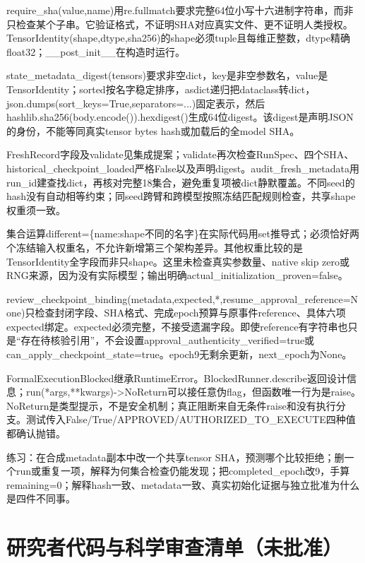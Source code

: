 \documentclass[UTF8,fontset=fandol,10pt]{ctexart}
\begin{document}
require\_\allowbreak{}sha(value,name)用re.fullmatch要求完整64位小写十六进制字符串，而非只检查某个子串。它验证格式，不证明SHA对应真实文件、更不证明人类授权。TensorIdentity(shape,dtype,sha256)的shape必须tuple且每维正整数，dtype精确float32；\_\allowbreak{}\_\allowbreak{}post\_\allowbreak{}init\_\allowbreak{}\_\allowbreak{}在构造时运行。

state\_\allowbreak{}metadata\_\allowbreak{}digest(tensors)要求非空dict，key是非空参数名，value是TensorIdentity；sorted按名字稳定排序，asdict递归把dataclass转dict，json.dumps(sort\_\allowbreak{}keys=True,separators=...)固定表示，然后hashlib.sha256(body.encode()).hexdigest()生成64位digest。该digest是声明JSON的身份，不能等同真实tensor bytes hash或加载后的全model SHA。

FreshRecord字段及validate见集成提案；validate再次检查RunSpec、四个SHA、historical\_\allowbreak{}checkpoint\_\allowbreak{}loaded严格False以及声明digest。audit\_\allowbreak{}fresh\_\allowbreak{}metadata用run\_\allowbreak{}id建查找dict，再核对完整18集合，避免重复项被dict静默覆盖。不同seed的hash没有自动相等约束；同seed跨臂和跨模型按照冻结匹配规则检查，共享shape权重须一致。

集合运算different=\{name:shape不同的名字\}在实际代码用set推导式；必须恰好两个冻结输入权重名，不允许新增第三个架构差异。其他权重比较的是TensorIdentity全字段而非只shape。这里未检查真实参数量、native skip zero或RNG来源，因为没有实际模型；输出明确actual\_\allowbreak{}initialization\_\allowbreak{}proven=false。

review\_\allowbreak{}checkpoint\_\allowbreak{}binding(metadata,expected,*,resume\_\allowbreak{}approval\_\allowbreak{}reference=None)只检查封闭字段、SHA格式、完成epoch预算与原事件reference、具体六项expected绑定。expected必须完整，不接受遗漏字段。即使reference有字符串也只是“存在待核验引用”，不会设置approval\_\allowbreak{}authenticity\_\allowbreak{}verified=true或can\_\allowbreak{}apply\_\allowbreak{}checkpoint\_\allowbreak{}state=true。epoch9无剩余更新，next\_\allowbreak{}epoch为None。

FormalExecutionBlocked继承RuntimeError。BlockedRunner.describe返回设计信息；run(*args,**kwargs)->NoReturn可以接任意伪flag，但函数唯一行为是raise。NoReturn是类型提示，不是安全机制；真正阻断来自无条件raise和没有执行分支。测试传入False/\allowbreak{}True/\allowbreak{}APPROVED/\allowbreak{}AUTHORIZED\_\allowbreak{}TO\_\allowbreak{}EXECUTE四种值都确认抛错。

练习：在合成metadata副本中改一个共享tensor SHA，预测哪个比较拒绝；删一个run或重复一项，解释为何集合检查仍能发现；把completed\_\allowbreak{}epoch改9，手算remaining=0；解释hash一致、metadata一致、真实初始化证据与独立批准为什么是四件不同事。
\clearpage\section{研究者代码与科学审查清单（未批准）}
\end{document}
